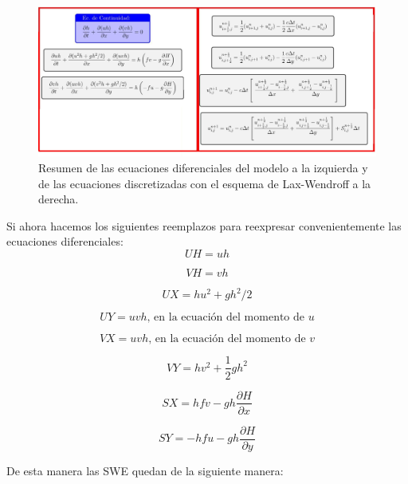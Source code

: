 \documentclass[12pt,dvipsnames]{exam}
\begin{document}
\begin{figure}[H]
\centering
\includegraphics[scale=0.35]{reseqs.jpeg}
\caption{Resumen de las ecuaciones diferenciales del modelo a la izquierda y de las ecuaciones discretizadas con el esquema de Lax-Wendroff a la derecha.} \label{reqs}
\end{figure}

Si ahora hacemos los siguientes reemplazos para reexpresar convenientemente las ecuaciones diferenciales:
\begin{equation*}
UH = u h
\end{equation*}

\begin{equation*}
VH = v h
\end{equation*}

\begin{equation*}
UX = hu^{2} + gh^{2}/2
\end{equation*}


\begin{equation*}
UY = uvh \text{, en la ecuación del momento de $u$}
\end{equation*}

\begin{equation*}
VX = uvh \text{, en la ecuación del momento de $v$}
\end{equation*}

\begin{equation*}
VY = hv^2+\frac{1}{2}gh^2
\end{equation*}

\begin{equation*}
SX = hfv - gh\dfrac{\partial H}{\partial x}
\end{equation*}

\begin{equation*}
SY = -hfu - gh\dfrac{\partial H}{\partial y}
\end{equation*}


De esta manera las SWE quedan de la siguiente manera:
\end{document}
